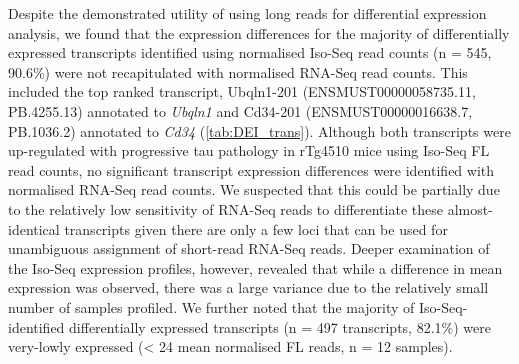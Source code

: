 Despite the demonstrated utility of using long reads for differential expression analysis, we found that the expression differences for the majority of differentially expressed transcripts identified using normalised Iso-Seq read counts (n = 545, 90.6\%) were not recapitulated with normalised RNA-Seq read counts. This included the top ranked transcript, Ubqln1-201 (ENSMUST00000058735.11, PB.4255.13) annotated to \textit{Ubqln1} and Cd34-201 (ENSMUST00000016638.7, PB.1036.2) annotated to \textit{Cd34} (\cref{tab:DEI_trans}). Although both transcripts were up-regulated with progressive tau pathology in rTg4510 mice using Iso-Seq FL read counts, no significant transcript expression differences were identified with normalised RNA-Seq read counts. We suspected that this could be partially due to the relatively low sensitivity of RNA-Seq reads to differentiate these almost-identical transcripts given there are only a few loci that can be used for unambiguous assignment of short-read RNA-Seq reads. Deeper examination of the Iso-Seq expression profiles, however, revealed that while a difference in mean expression was observed, there was a large variance due to the relatively small number of samples profiled. We further noted that the majority of Iso-Seq-identified differentially expressed transcripts (n = 497 transcripts, 82.1\%) were very-lowly expressed (< 24 mean normalised FL reads, n = 12 samples). 

